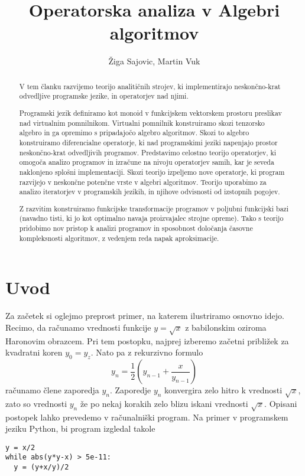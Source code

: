 \documentclass{article}
\title{Operatorska analiza v Algebri algoritmov}
\author{Žiga Sajovic, Martin Vuk}
\begin{document}
\maketitle
\begin{abstract}
  V tem članku razvijemo teorijo analitičnih strojev, ki implementirajo neskončno-krat odvedljive programske jezike, in operatorjev nad njimi.

  Programski jezik definiramo kot monoid v funkcijskem vektorskem prostoru preslikav nad virtualnim pomnilnikom. Virtualni pomnilnik konstruiramo skozi tenzorsko algebro in ga opremimo s pripadajočo algebro algoritmov. Skozi to algebro konstruiramo diferencialne operatorje, ki nad programskimi jeziki napenjajo prostor neskončno-krat odvedljivih programov. Predstavimo celostno teorijo operatorjev, ki omogoča analizo programov in izračune na nivoju operatorjev samih, kar je seveda naklonjeno splošni implementaciji. Skozi teorijo izpeljemo nove operatorje, ki program razvijejo v neskončne potenčne vrste v algebri algoritmov. Teorijo uporabimo za analizo iteratorjev v programskih jezikih, in njihove odvisnosti od izstopnih pogojev. 
  
  Z razvitim konstruiramo funkcijske transformacije programov v poljubni funkcijski bazi (navadno tisti, ki jo kot optimalno navaja proizvajalec strojne opreme). 
  Tako s teorijo pridobimo nov pristop k analizi programov in sposobnost določanja časovne kompleksnosti algoritmov, z vedenjem reda napak aproksimacije.
\end{abstract}
\section{Uvod}
Za začetek si oglejmo preprost primer, na katerem ilustriramo osnovno idejo.
Recimo, da računamo vrednosti funkcije $y=\sqrt{x}$ z babilonskim oziroma Haronovim obrazcem.
Pri tem postopku, najprej izberemo začetni približek za
kvadratni koren $y_0=y_z$. Nato pa z rekurzivno formulo
\begin{equation*}
  y_n=\frac{1}{2}\left( y_{n-1}+\frac{x}{y_{n-1}} \right)
\end{equation*}
računamo člene zaporedja $y_n$. Zaporedje $y_n$ konvergira zelo hitro k
vrednosti $\sqrt{x}$, zato so vrednosti $y_n$ že po nekaj korakih zelo blizu
iskani vrednosti $\sqrt{x}$. Opisani postopek lahko prevedemo v računalniški
program. Na primer v programskem jeziku Python, bi program izgledal takole 

\begin{verbatim}
y = x/2
while abs(y*y-x) > 5e-11:
  y = (y+x/y)/2
\end{verbatim}
\end{document}
